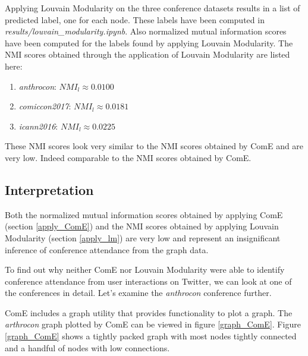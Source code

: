 \documentclass[sigconf]{acmart}
\begin{document}
Applying Louvain Modularity on the three conference datasets results in a list of predicted label, one for each node. These labels have been computed in \textit{results/louvain\_modularity.ipynb}. Also normalized mutual information scores have been computed for the labels found by applying Louvain Modularity. The NMI scores obtained through the application of Louvain Modularity are listed here:

\begin{enumerate}
	\item \textit{anthrocon}: $NMI_l \approx 0.0100$
	\item \textit{comiccon2017}: $NMI_l \approx 0.0181$
	\item \textit{icann2016}: $NMI_l \approx 0.0225$
\end{enumerate}

These NMI scores look very similar to the NMI scores obtained by ComE and are very low. Indeed comparable to the NMI scores obtained by ComE.

\subsection{Interpretation}

Both the normalized mutual information scores obtained by applying ComE (section \ref{apply_ComE}) and the NMI scores obtained by applying Louvain Modularity (section \ref{apply_lm}) are very low and represent an insignificant inference of conference attendance from the graph data.

To find out why neither ComE nor Louvain Modularity were able to identify conference attendance from user interactions on Twitter, we can look at one of the conferences in detail. Let's examine the \textit{anthrocon} conference further.

ComE includes a graph utility that provides functionality to plot a graph. The \textit{arthrocon} graph plotted by ComE can be viewed in figure \ref{graph_ComE}. Figure \ref{graph_ComE} shows a tightly packed graph with most nodes tightly connected and a handful of nodes with low connections.
\end{document}
